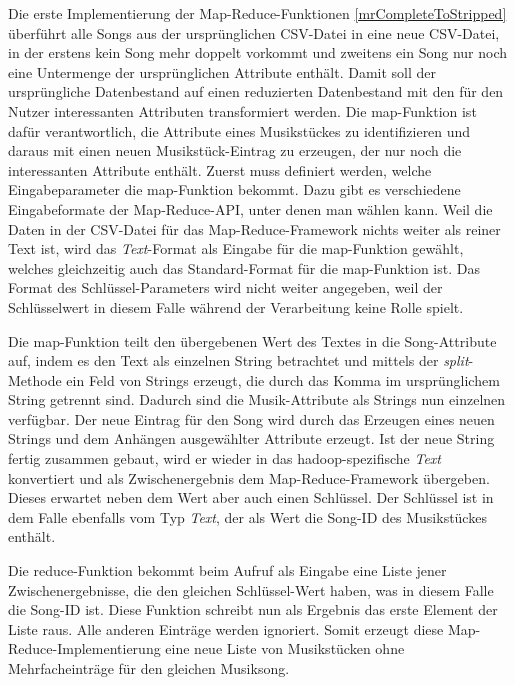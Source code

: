 Die erste Implementierung der Map-Reduce-Funktionen \ref{mrCompleteToStripped} überführt alle Songs aus der ursprünglichen
CSV-Datei in eine neue CSV-Datei, in der erstens kein Song mehr doppelt vorkommt und zweitens
ein Song nur noch eine Untermenge der ursprünglichen Attribute enthält. Damit soll der ursprüngliche
Datenbestand auf einen reduzierten Datenbestand mit den für den Nutzer interessanten Attributen 
transformiert werden. Die map-Funktion ist dafür verantwortlich, die Attribute eines Musikstückes
zu identifizieren und daraus mit einen neuen Musikstück-Eintrag zu erzeugen, der nur noch die interessanten
Attribute enthält.
Zuerst muss definiert werden, welche Eingabeparameter die map-Funktion bekommt. Dazu gibt es verschiedene
Eingabeformate der Map-Reduce-API, unter denen man wählen kann. Weil die Daten in der CSV-Datei für das
Map-Reduce-Framework nichts weiter als reiner Text ist, wird das \textit{Text}-Format als Eingabe für
die map-Funktion gewählt, welches gleichzeitig auch das Standard-Format für die map-Funktion ist.
Das Format des Schlüssel-Parameters wird nicht weiter angegeben, weil der Schlüsselwert in diesem Falle 
während der Verarbeitung keine Rolle spielt.

Die map-Funktion teilt den übergebenen Wert des Textes in die Song-Attribute auf, indem es den Text
als einzelnen String betrachtet und mittels der \textit{split}-Methode ein Feld von Strings erzeugt, die durch
das Komma im ursprünglichem String getrennt sind. Dadurch sind die Musik-Attribute als Strings nun einzelnen verfügbar.
Der neue Eintrag für den Song wird durch das Erzeugen eines neuen Strings und dem Anhängen ausgewählter
Attribute erzeugt. Ist der neue String fertig zusammen gebaut, wird er wieder in das hadoop-spezifische \textit{Text}
konvertiert und als Zwischenergebnis dem Map-Reduce-Framework übergeben. Dieses erwartet neben dem 
Wert aber auch einen Schlüssel. Der Schlüssel ist in dem Falle ebenfalls vom Typ \textit{Text}, der als Wert die
Song-ID des Musikstückes enthält.

Die reduce-Funktion bekommt beim Aufruf als Eingabe eine Liste jener Zwischenergebnisse, die den gleichen 
Schlüssel-Wert haben, was in diesem Falle die Song-ID ist. 
Diese Funktion schreibt nun als Ergebnis das erste Element der Liste raus. Alle anderen
Einträge werden ignoriert. Somit erzeugt diese Map-Reduce-Implementierung eine neue Liste
von Musikstücken ohne Mehrfacheinträge für den gleichen Musiksong.

